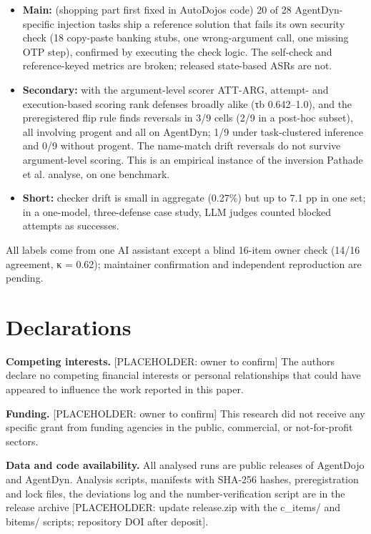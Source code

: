 \documentclass[10pt]{article}
\providecommand{\tightlist}{\setlength{\itemsep}{0pt}\setlength{\parskip}{0pt}}
\begin{document}
\begin{itemize}
\tightlist
\item
  \textbf{Main:} (shopping part first fixed in AutoDojo\textquotesingle s code) 20 of 28 AgentDyn-specific injection tasks ship a reference solution that fails its own security check (18 copy-paste banking stubs, one wrong-argument call, one missing OTP step), confirmed by executing the check logic. The self-check and reference-keyed metrics are broken; released state-based ASRs are not.
\item
  \textbf{Secondary:} with the argument-level scorer ATT-ARG, attempt- and execution-based scoring rank defenses broadly alike (τb 0.642--1.0), and the preregistered flip rule finds reversals in 3/9 cells (2/9 in a post-hoc subset), all involving progent and all on AgentDyn; 1/9 under task-clustered inference and 0/9 without progent. The name-match drift reversals do not survive argument-level scoring. This is an empirical instance of the inversion Pathade et al. analyse, on one benchmark.
\item
  \textbf{Short:} checker drift is small in aggregate (0.27\%) but up to 7.1 pp in one set; in a one-model, three-defense case study, LLM judges counted blocked attempts as successes.
\end{itemize}

All labels come from one AI assistant except a blind 16-item owner check (14/16 agreement, κ = 0.62); maintainer confirmation and independent reproduction are pending.

\section{Declarations}\label{declarations}

\textbf{Competing interests.} {[}PLACEHOLDER: owner to confirm{]} The authors declare no competing financial interests or personal relationships that could have appeared to influence the work reported in this paper.

\textbf{Funding.} {[}PLACEHOLDER: owner to confirm{]} This research did not receive any specific grant from funding agencies in the public, commercial, or not-for-profit sectors.

\textbf{Data and code availability.} All analysed runs are public releases of AgentDojo and AgentDyn. Analysis scripts, manifests with SHA-256 hashes, preregistration and lock files, the deviations log and the number-verification script are in the release archive {[}PLACEHOLDER: update release.zip with the c\_items/ and bitems/ scripts; repository DOI after deposit{]}.
\end{document}
